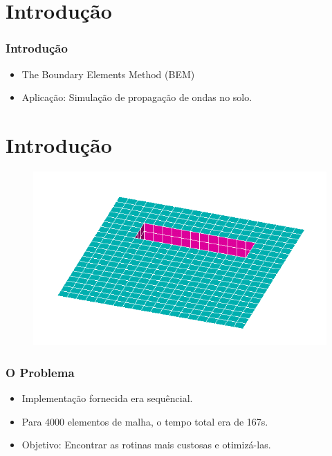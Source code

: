 \documentclass{beamer}
\begin{document}
%

\section{Introdução}
\begin{frame}
\frametitle{Introdução}
\begin{itemize}
\item The Boundary Elements Method (BEM) 
\item Aplicação: Simulação de propagação de ondas no solo. 
\end{itemize}
\end{frame}


\section{Introdução}
\begin{frame}
\begin{figure}
	\includegraphics[scale=0.5]{trincheira.png}
\end{figure}

\end{frame}


\begin{frame}
\frametitle{O Problema}
\begin{itemize}
\item Implementação fornecida era sequêncial.
\item Para 4000 elementos de malha, o tempo total era de 167s.
\item Objetivo: Encontrar as rotinas mais custosas e otimizá-las.
\end{itemize}
\end{frame}
\end{document}
